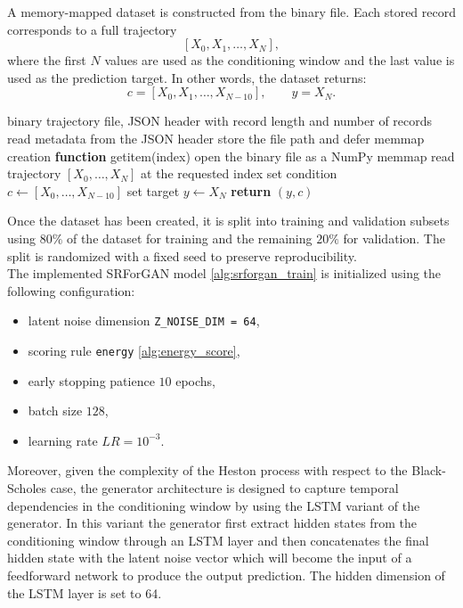A memory-mapped dataset is constructed from the binary file. Each stored record corresponds to a full trajectory
\[
[X_0, X_1, \dots, X_N],
\]
where the first $N$ values are used as the conditioning window and the last value is used as the prediction target. In other words, the dataset returns:
\[
c = [X_0, X_1, \dots, X_{N-10}], \qquad y = X_N.
\]


\begin{algorithm}[H]
\caption{Lazy access to the memory-mapped dataset}
\label{alg:memmap_dataset}
\begin{algorithmic}[1]
\REQUIRE binary trajectory file, JSON header with record length and number of records
\STATE read metadata from the JSON header
\STATE store the file path and defer memmap creation
\STATE \textbf{function} getitem(index)
    \STATE open the binary file as a NumPy memmap
\ENDIF
\STATE read trajectory $[X_0, \dots, X_N]$ at the requested index
\STATE set condition $c \leftarrow [X_0, \dots, X_{N-10}]$
\STATE set target $y \leftarrow X_N$
\STATE \textbf{return} $(y,c)$
\end{algorithmic}
\end{algorithm}


Once the dataset has been created, it is split into training and validation subsets using $80\%$ of the dataset for training and the remaining $20\%$ for validation.
The split is randomized with a fixed seed to preserve reproducibility.\\

The implemented SRForGAN model \ref{alg:srforgan_train} is initialized using the following configuration:
\begin{itemize}
    \item latent noise dimension \texttt{Z\_NOISE\_DIM = 64},
    \item scoring rule \texttt{energy} \ref{alg:energy_score},
    \item early stopping patience $ 10$ epochs,
    \item batch size  $128$,
    \item learning rate \texttt{$LR = 10^{-3}$}.
\end{itemize}

Moreover, given the complexity of the Heston process with respect to the Black-Scholes case, 
the generator architecture is designed to capture temporal dependencies in the conditioning window
by using the LSTM variant of the generator. In this variant the generator first extract hidden states from the conditioning window through an LSTM layer and then concatenates the final hidden state with 
the latent noise vector which will become the input of a feedforward network to produce the output prediction.
The hidden dimension of the LSTM layer is set to 64.\\

